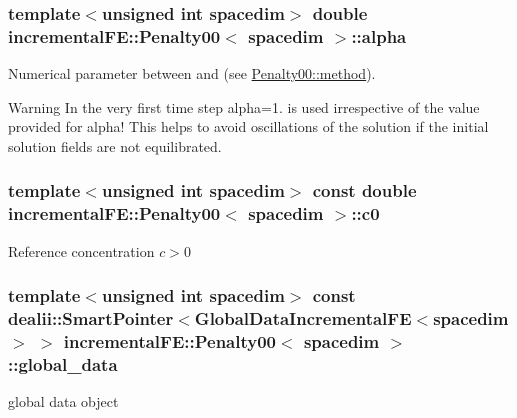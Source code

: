 \subsubsection[{\texorpdfstring{alpha}{alpha}}]{\setlength{\rightskip}{0pt plus 5cm}template$<$unsigned int spacedim$>$ double {\bf incremental\+F\+E\+::\+Penalty00}$<$ spacedim $>$\+::alpha\hspace{0.3cm}{\ttfamily [private]}}\hypertarget{classincremental_f_e_1_1_penalty00_a347920b03b04ffdd4165f10dbceef2d0}{}\label{classincremental_f_e_1_1_penalty00_a347920b03b04ffdd4165f10dbceef2d0}
Numerical parameter between {} and {} (see \hyperlink{classincremental_f_e_1_1_penalty00_ac7ea7353834168a0cc76dbed74d4e947}{Penalty00\+::method}).

\begin{DoxyWarning}{Warning}
In the very first time step {\ttfamily alpha=1.} is used irrespective of the value provided for {\ttfamily alpha!} This helps to avoid oscillations of the solution if the initial solution fields are not equilibrated. 
\end{DoxyWarning}
\subsubsection[{\texorpdfstring{c0}{c0}}]{\setlength{\rightskip}{0pt plus 5cm}template$<$unsigned int spacedim$>$ const double {\bf incremental\+F\+E\+::\+Penalty00}$<$ spacedim $>$\+::c0\hspace{0.3cm}{\ttfamily [private]}}\hypertarget{classincremental_f_e_1_1_penalty00_a46894651008423818d058f782f2c95cd}{}\label{classincremental_f_e_1_1_penalty00_a46894651008423818d058f782f2c95cd}
Reference concentration $c>0$ 
\subsubsection[{\texorpdfstring{global\+\_\+data}{global_data}}]{\setlength{\rightskip}{0pt plus 5cm}template$<$unsigned int spacedim$>$ const dealii\+::\+Smart\+Pointer$<${\bf Global\+Data\+Incremental\+FE}$<$spacedim$>$ $>$ {\bf incremental\+F\+E\+::\+Penalty00}$<$ spacedim $>$\+::global\+\_\+data\hspace{0.3cm}{\ttfamily [private]}}\hypertarget{classincremental_f_e_1_1_penalty00_a47da63117248061345d035043ec80b1f}{}\label{classincremental_f_e_1_1_penalty00_a47da63117248061345d035043ec80b1f}
global data object 
